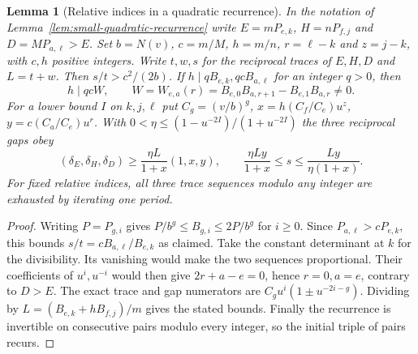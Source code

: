 \documentclass[11pt,reqno]{amsart}
\newtheorem{lemma}[theorem]{Lemma}
\theoremstyle{remark}\newtheorem{remark}[theorem]{Remark}
\numberwithin{equation}{section}
\begin{document}
\begin{lemma}[Relative indices in a quadratic recurrence]\label{lem:relative-quadratic-indices}
In the notation of Lemma~\ref{lem:small-quadratic-recurrence} write
$E=mP_{e,k}$, $H=nP_{f,j}$ and $D=MP_{a,\ell}>E$. Set $b=N(v)$,
$c=m/M$, $h=m/n$, $r=\ell-k$ and $z=j-k$, with $c,h$ positive
integers. Write $t,w,s$ for the reciprocal traces of $E,H,D$ and
$L=t+w$. Then $s/t>c^2/(2b)$. If $h\mid qB_{e,k},qcB_{a,\ell}$
for an integer $q>0$, then
\[
 h\mid qcW,\qquad
 W=W_{e,a}(r)=B_{e,0}B_{a,r+1}-B_{e,1}B_{a,r}\ne0 .
\]
For a lower bound $I$ on $k,j,\ell$ put $C_g=(v/b)^g$,
$x=h(C_f/C_e)u^z$, $y=c(C_a/C_e)u^r$. With
$0<\eta\le(1-u^{-2I})/(1+u^{-2I})$ the three reciprocal gaps obey
\[
 (\delta_E,\delta_H,\delta_D)\ge
 \frac{\eta L}{1+x}(1,x,y),\qquad
 \frac{\eta Ly}{1+x}\le s\le\frac{Ly}{\eta(1+x)} .
\]
For fixed relative indices, all three trace sequences modulo any
integer are exhausted by iterating one period.
\end{lemma}
\begin{proof}
Writing $P=P_{g,i}$ gives
$P/b^g\le B_{g,i}\le2P/b^g$ for $i\ge0$. Since
$P_{a,\ell}>cP_{e,k}$, this bounds $s/t=cB_{a,\ell}/B_{e,k}$
as claimed. Take the constant determinant at $k$ for the divisibility.
Its vanishing would make the two sequences proportional. Their
coefficients of $u^i,u^{-i}$ would then give $2r+a-e=0$, hence
$r=0,a=e$, contrary to $D>E$. The exact trace and gap numerators
are $C_g u^i(1\pm u^{-2i-g})$. Dividing by
$L=(B_{e,k}+hB_{f,j})/m$ gives the stated bounds. Finally the
recurrence is invertible on consecutive pairs modulo every integer,
so the initial triple of pairs recurs.
\end{proof}
\end{document}
